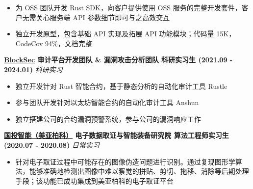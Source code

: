     \begin{itemize}
        \item 为 OSS 团队开发 Rust SDK，向客户提供使用 OSS 服务的完整开发套件，客户无需关心服务端 API 参数细节即可与之高效交互
        \item 独立开发原型，包含基础 API 实现及拓展 API 功能模块；代码量 15K，CodeCov 94\%，文档完整
    \end{itemize}

    \noindent\textbf{\href{https://blocksec.com}{BlockSec} \textbar{} 审计平台开发团队 \& 漏洞攻击分析团队 \textbar{} 科研实习生 (2021.09 - 2024.01)} \hfill \textsl{科研实习}

    \begin{itemize}
        \item 独立开发针对 Rust 智能合约，基于静态分析的自动化审计工具 Rustle
        \item 参与团队开发针对以太坊智能合约的自动化审计工具 Anshun
        \item 独立搭建公司的合约漏洞预警系统，参与公司的漏洞响应工作
    \end{itemize}

    \noindent\textbf{\href{https://300188.cn}{国投智能（美亚柏科）} \textbar{} 电子数据取证与智能装备研究院 \textbar{} 算法工程师实习生 (2020.07 - 2020.08)} \hfill \textsl{日常实习}


    \begin{itemize}
        \item 针对电子取证过程中可能存在的图像伪造问题进行识别。通过复现图形学算法，能够准确地检测出图像中难以察觉的拼贴、剪切、拖移、消除等后期处理手段；该功能已成功集成到美亚柏科的电子取证平台
    \end{itemize}

\fi

\hfill
